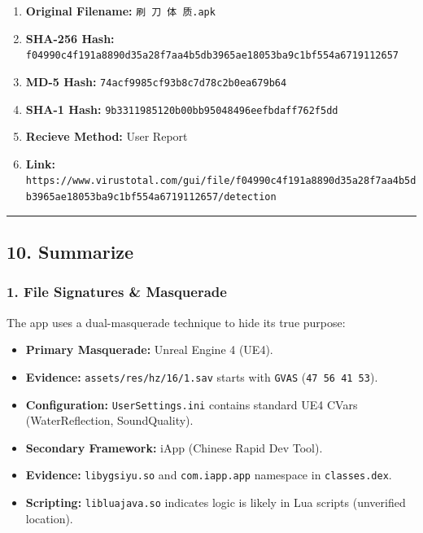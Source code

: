 \documentclass[
]{article}
\begin{document}
\begin{enumerate}
\def\labelenumi{\arabic{enumi}.}
\item
  \textbf{Original Filename:} \texttt{刷\ 刀\ 体\ 质.apk}
\item
  \textbf{SHA-256 Hash:}
  \texttt{f04990c4f191a8890d35a28f7aa4b5db3965ae18053ba9c1bf554a6719112657}
\item
  \textbf{MD-5 Hash:} \texttt{74acf9985cf93b8c7d78c2b0ea679b64}
\item
  \textbf{SHA-1 Hash:} \texttt{9b3311985120b00bb95048496eefbdaff762f5dd}
\item
  \textbf{Recieve Method:} User Report
\item
  \textbf{Link:}
  \texttt{https://www.virustotal.com/gui/file/f04990c4f191a8890d35a28f7aa4b5db3965ae18053ba9c1bf554a6719112657/detection}
\end{enumerate}

\begin{center}\rule{0.5\linewidth}{0.5pt}\end{center}

\subsection{\texorpdfstring{\textbf{10.
Summarize}}{10. Summarize}}\label{10-summarize}

\subsubsection{1. File Signatures \&
Masquerade}\label{1-file-signatures--masquerade}

The app uses a dual-masquerade technique to hide its true purpose:

\begin{itemize}
\item
  \textbf{Primary Masquerade:} Unreal Engine 4 (UE4).
\item
  \textbf{Evidence:} \texttt{assets/res/hz/16/1.sav} starts with
  \texttt{GVAS} (\texttt{47\ 56\ 41\ 53}).
\item
  \textbf{Configuration:} \texttt{UserSettings.ini} contains standard
  UE4 CVars (WaterReflection, SoundQuality).
\end{itemize}

\begin{itemize}
\item
  \textbf{Secondary Framework:} iApp (Chinese Rapid Dev Tool).
\item
  \textbf{Evidence:} \texttt{libygsiyu.so} and \texttt{com.iapp.app}
  namespace in \texttt{classes.dex}.
\item
  \textbf{Scripting:} \texttt{libluajava.so} indicates logic is likely
  in Lua scripts (unverified location).
\end{itemize}
\end{document}
